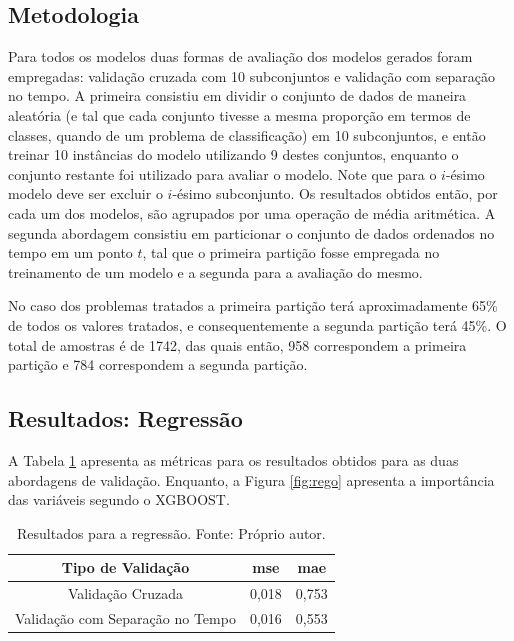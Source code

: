 \subsection{Metodologia}

Para todos os modelos duas formas de avaliação dos modelos gerados foram empregadas: validação cruzada com 10 subconjuntos e validação com separação no tempo. A primeira consistiu em dividir o conjunto de dados de maneira aleatória (e tal que cada conjunto tivesse a mesma proporção em termos de classes, quando de um problema de classificação) em 10 subconjuntos, e então treinar 10 instâncias do modelo utilizando 9 destes conjuntos, enquanto o conjunto restante foi utilizado para avaliar o modelo. Note que para o $i$-ésimo modelo deve ser excluir o $i$-ésimo subconjunto. Os resultados obtidos então, por cada um dos modelos, são agrupados por uma operação de média aritmética. A segunda abordagem consistiu em particionar o conjunto de dados ordenados no tempo em um ponto $t$, tal que o primeira partição fosse empregada no treinamento de um modelo e a segunda para a avaliação do mesmo.

No caso dos problemas tratados a primeira partição terá aproximadamente 65\% de todos os valores tratados, e consequentemente a segunda partição terá 45\%. O total de amostras é de 1742, das quais então, 958 correspondem a primeira partição e 784 correspondem a segunda partição.


\subsection{Resultados: Regressão}

A Tabela \ref{tab:results_reg} apresenta as métricas para os resultados obtidos para as duas abordagens de validação. Enquanto, a Figura \ref{fig:rego} apresenta a importância das variáveis segundo o XGBOOST.

\begin{table}[H]
\begin{center}
\begin{tabular}{|c|c|c|}
\hline
Tipo de Validação & mse       & mae   \\ \hline
Validação Cruzada                   & 0,018   & 0,753  \\ \hline
Validação com Separação no Tempo    & 0,016   & 0,553  \\ \hline
\end{tabular}
\end{center}
\vspace{12pt}
\caption{Resultados para a regressão. Fonte: Próprio autor.}
\label{tab:results_reg}
\end{table}

